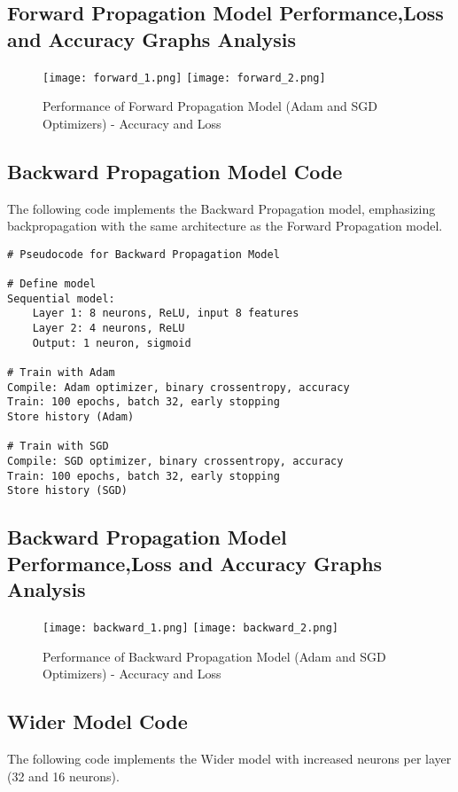 \documentclass[a4paper,12pt]{article}
\begin{document}
\subsection*{Forward Propagation Model Performance,Loss and Accuracy Graphs Analysis}
\begin{figure}[h]
    \centering
    \texttt{[image: forward\_1.png]}
    \texttt{[image: forward\_2.png]}
    \caption{Performance of Forward Propagation Model (Adam and SGD Optimizers) - Accuracy and Loss}
\end{figure}

\subsection*{Backward Propagation Model Code}
The following code implements the Backward Propagation model, emphasizing backpropagation with the same architecture as the Forward Propagation model.

\begin{verbatim}
# Pseudocode for Backward Propagation Model

# Define model
Sequential model:
    Layer 1: 8 neurons, ReLU, input 8 features
    Layer 2: 4 neurons, ReLU
    Output: 1 neuron, sigmoid

# Train with Adam
Compile: Adam optimizer, binary crossentropy, accuracy
Train: 100 epochs, batch 32, early stopping
Store history (Adam)

# Train with SGD
Compile: SGD optimizer, binary crossentropy, accuracy
Train: 100 epochs, batch 32, early stopping
Store history (SGD)
\end{verbatim}
\subsection*{Backward Propagation Model Performance,Loss and Accuracy Graphs Analysis}
\begin{figure}[h]
    \centering
    \texttt{[image: backward\_1.png]}
    \texttt{[image: backward\_2.png]}
    \caption{Performance of Backward Propagation Model (Adam and SGD Optimizers) - Accuracy and Loss}
\end{figure}
\newpage

\subsection*{Wider Model Code}
The following code implements the Wider model with increased neurons per layer (32 and 16 neurons).
\end{document}
